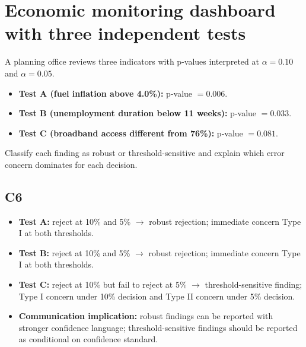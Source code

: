 	\section{Economic monitoring dashboard with three independent tests}
	A planning office reviews three indicators with p-values interpreted at \(\alpha=0.10\) and \(\alpha=0.05\).
	\begin{itemize}
		\item \textbf{Test A (fuel inflation above 4.0\%):} p-value \(=0.006\).
		\item \textbf{Test B (unemployment duration below 11 weeks):} p-value \(=0.033\).
		\item \textbf{Test C (broadband access different from 76\%):} p-value \(=0.081\).
	\end{itemize}
	Classify each finding as robust or threshold-sensitive and explain which error concern dominates for each decision.
	
	\begin{center}
		\hspace{0.6cm}
	\end{center}
	
	\begin{center}
		\hspace{0.8cm}
	\end{center}
	
	\subsection*{C6}
	\begin{itemize}
		\item \textbf{Test A:} reject at 10\% and 5\% $\rightarrow$ robust rejection; immediate concern Type I at both thresholds.
		\item \textbf{Test B:} reject at 10\% and 5\% $\rightarrow$ robust rejection; immediate concern Type I at both thresholds.
		\item \textbf{Test C:} reject at 10\% but fail to reject at 5\% $\rightarrow$ threshold-sensitive finding; Type I concern under 10\% decision and Type II concern under 5\% decision.
		\item \textbf{Communication implication:} robust findings can be reported with stronger confidence language; threshold-sensitive findings should be reported as conditional on confidence standard.
	\end{itemize}
	
